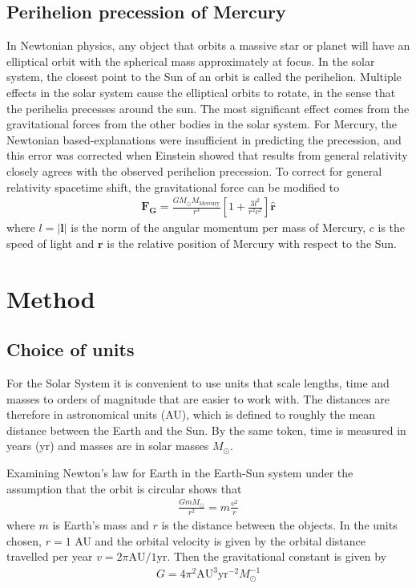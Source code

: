 \documentclass[aps,reprint]{revtex4-1}
\begin{document}
\subsection{Perihelion precession of Mercury}
In Newtonian physics, any object that orbits a massive star or planet will have an elliptical orbit with
the spherical mass approximately at focus. In the solar system, the closest point to the Sun of an orbit is called
the perihelion. Multiple effects in the solar system cause the elliptical orbits to rotate, in the sense that the perihelia
precesses around the sun. The most significant effect comes from the gravitational forces from the other bodies in
the solar system. For Mercury, the Newtonian based-explanations were insufficient in predicting the precession, and
this error was corrected when Einstein showed that results from general relativity closely agrees with the observed
perihelion precession. To correct for general relativity spacetime shift, the gravitational force can be modified to
\begin{align}
\label{eq:mercuryprecession}
\mathbf{F_G} = \frac{G M_\odot M_\text{Mercury}}{r^3}\left[1 + \frac{3l^2}{r^2c^2} \right] \hat{\mathbf{r}}
\end{align}
where $l = |\mathbf{l}|$ is the norm of the angular momentum per mass of Mercury, $c$ is the speed of light and
$\mathbf{r}$ is the relative position of Mercury with respect to the Sun.
\section{Method}
\label{sec:method}
\subsection{Choice of units}
For the Solar System it is convenient to use units that scale lengths, time and
masses to orders of magnitude that are easier to work with. The distances are
therefore in astronomical units (AU), which is defined to roughly the mean
distance between the Earth and the Sun. By the same token, time is measured in
years (yr) and masses are in solar masses $M_\odot$.

Examining Newton's law for Earth in the Earth-Sun system under the assumption
that the orbit is circular shows that
\begin{align*}
  \frac{GmM_\odot}{r^2} = m \frac{v^2}{r}
\end{align*}
where $m$ is Earth's mass and $r$ is the distance between the objects. In the
units chosen, $r = 1$ AU and the orbital velocity is given by the orbital distance
travelled per year $v = 2\pi \text{AU}/1 \text{yr}$. Then the gravitational
constant is given by
\begin{align}
  G = 4\pi^2 \text{AU}^3 \text{yr}^{-2} M_\odot^{-1}
\end{align}
\end{document}
